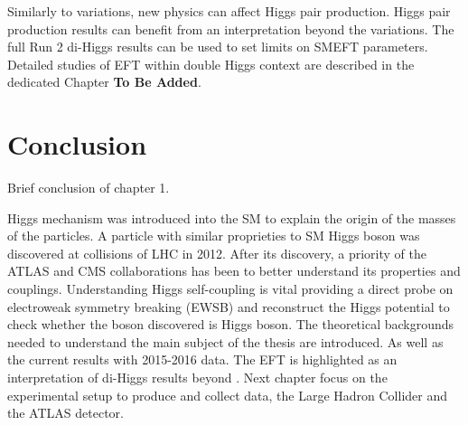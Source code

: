Similarly to \kl variations, new physics can affect Higgs pair production. Higgs pair production results can benefit from an interpretation beyond the \kl variations. The full Run 2 di-Higgs results can be used to set limits on SMEFT parameters. Detailed studies of EFT within double Higgs context are described in the dedicated Chapter \textbf{To Be Added}.
\section{Conclusion}
\label{chap1:Conc}

Brief conclusion of chapter 1.

Higgs mechanism was introduced into the SM to explain the origin of the masses of the particles. A particle with similar proprieties to SM Higgs boson was discovered at collisions of LHC in 2012. After its discovery, a priority of the ATLAS and CMS collaborations has been to better understand its properties and couplings. Understanding Higgs self-coupling is vital providing a direct probe on electroweak symmetry breaking (EWSB) and reconstruct the Higgs potential to check whether the boson discovered is Higgs boson. The theoretical backgrounds needed to understand the main subject of the thesis are introduced. As well as the current results with 2015-2016 data. The EFT is highlighted as an interpretation of di-Higgs results beyond \kl. Next chapter focus on the experimental setup to produce and collect data, the Large Hadron Collider and the ATLAS detector. 

